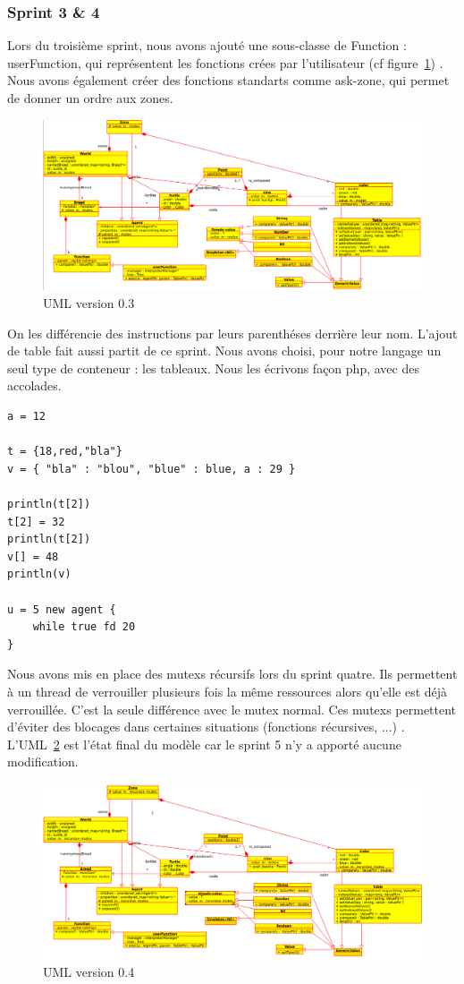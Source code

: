 \subsubsection{Sprint 3 \& 4}
Lors du troisième sprint, nous avons ajouté une sous-classe de Function : userFunction, qui représentent les fonctions crées par l'utilisateur (cf figure~\ref{v0.3}) . Nous avons également créer des fonctions standarts comme ask-zone, qui permet de donner un ordre aux zones.
\begin{figure}[h]
\caption{\label{v0.3} UML version 0.3}
\includegraphics[scale=0.4]{doc/report/uml/v03.png}
\end{figure}

On les différencie des instructions par leurs parenthéses derrière leur nom.
L'ajout de table fait aussi partit de ce sprint. Nous avons choisi, pour notre langage un seul type de conteneur : les tableaux.
Nous les écrivons façon php, avec des accolades.\\
\begin{lstlisting}
a = 12

t = {18,red,"bla"}
v = { "bla" : "blou", "blue" : blue, a : 29 }

println(t[2])
t[2] = 32
println(t[2])
v[] = 48
println(v)

u = 5 new agent {
	while true fd 20
}
\end{lstlisting}

Nous avons mis en place des mutexs récursifs lors du sprint quatre. Ils permettent à un thread de verrouiller plusieurs fois la même ressources alors qu'elle est déjà verrouillée. C'est la seule différence avec le mutex normal. Ces mutexs permettent d'éviter des blocages dans certaines situations (fonctions récursives, ...) .
L'UML~\ref{v0.4} est l'état final du modèle car le sprint 5 n'y a apporté aucune modification. 
\begin{figure}[h]
\caption{\label{v0.4} UML version 0.4}
\includegraphics[scale=0.4]{doc/report/uml/v04.png}
\end{figure}

